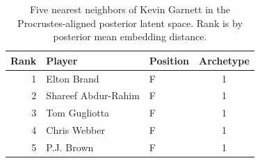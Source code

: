 \begin{table}[htbp]
  \centering\small
  \begin{tabular}{rllc}
    \toprule
    Rank & Player & Position & Archetype \\
    \midrule
    1 & Elton Brand & F & 1 \\
    2 & Shareef Abdur-Rahim & F & 1 \\
    3 & Tom Gugliotta & F & 1 \\
    4 & Chris Webber & F & 1 \\
    5 & P.J. Brown & F & 1 \\
    \bottomrule
  \end{tabular}
  \caption{Five nearest neighbors of Kevin Garnett in the Procrustes-aligned posterior latent space. Rank is by posterior mean embedding distance.}
  \label{tab:Kevin_Garnett_neighbors}
\end{table}

